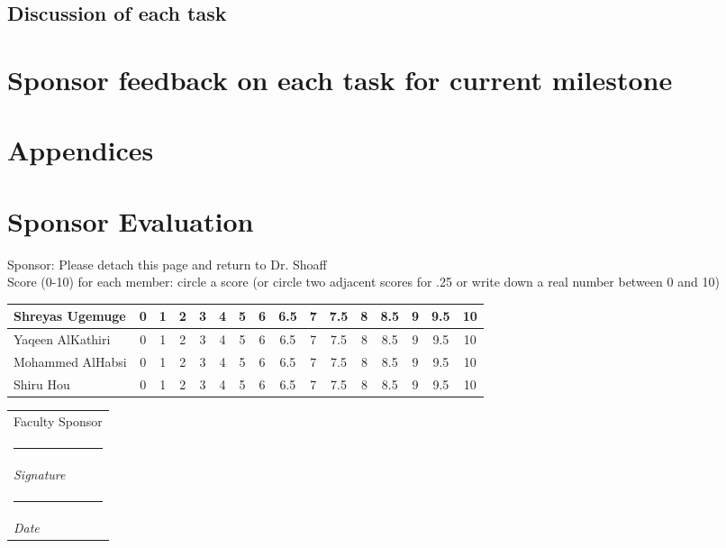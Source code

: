 \documentclass[12pt]{article}
\makeatletter
\newcommand{\namesigdate}[2][5cm]{%
  \begin{tabular}{@{}p{#1}@{}}
    #2 \\[2\normalbaselineskip] \hrule \\[0pt]
    {\small \textit{Signature}} \\ [2\normalbaselineskip] \hrule \\[0pt]
    {\small \textit{Date}}
  \end{tabular}
}
\makeatother
\begin{document}
	\subsection{Discussion of each task}

	\pagebreak
	\section{Sponsor feedback on each task for current milestone}
	\pagebreak
	\section{Appendices}
	\pagebreak
	\section{Sponsor Evaluation}
	Sponsor: Please detach this page and return to Dr. Shoaff \\ \hfill \break 
	Score (0-10) for each member: circle a score (or circle two adjacent scores for .25 or write down a real number between 0 and 10) \\ \hfill \break
	\begin{tabularx}{\textwidth}{|X|c|c|c|c|c|c|c|c|c|c|c|c|c|c|c|}
	\hline
	Shreyas Ugemuge & 0 & 1 &  2 & 3 & 4 & 5 & 6 & 6.5 & 7 & 7.5 & 8 & 8.5 & 9 & 9.5 & 10 \\ \hline
	Yaqeen AlKathiri & 0 & 1 &  2 & 3 & 4 & 5 & 6 & 6.5 & 7 & 7.5 & 8 & 8.5 & 9 & 9.5 & 10 \\ \hline
	Mohammed AlHabsi & 0 & 1 &  2 & 3 & 4 & 5 & 6 & 6.5 & 7 & 7.5 & 8 & 8.5 & 9 & 9.5 & 10 \\ \hline
	Shiru Hou & 0 & 1 &  2 & 3 & 4 & 5 & 6 & 6.5 & 7 & 7.5 & 8 & 8.5 & 9 & 9.5 & 10 \\ 
	\hline 
	\end{tabularx}
	\hfil \break
	\hfil \break
	\namesigdate{Faculty Sponsor}
	
\end{document}
